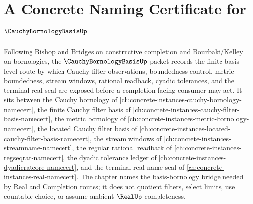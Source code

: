 \chapter{A Concrete Naming Certificate for $\CauchyBornologyBasisUp$}
\label{ch:concrete-instances-cauchy-bornology-basis-namecert}

Following Bishop and Bridges on constructive completion and Bourbaki/Kelley on bornologies, the $\CauchyBornologyBasisUp$ packet records the finite basis-level route by which Cauchy filter observations, boundedness control, metric boundedness, stream windows, rational readback, dyadic tolerances, and the terminal real seal are exposed before a completion-facing consumer may act. It sits between the Cauchy bornology of \autoref{ch:concrete-instances-cauchy-bornology-namecert}, the finite Cauchy filter basis of \autoref{ch:concrete-instances-cauchy-filter-basis-namecert}, the metric bornology of \autoref{ch:concrete-instances-metric-bornology-namecert}, the located Cauchy filter basis of \autoref{ch:concrete-instances-located-cauchy-filter-basis-namecert}, the stream windows of \autoref{ch:concrete-instances-streamname-namecert}, the regular rational readback of \autoref{ch:concrete-instances-regseqrat-namecert}, the dyadic tolerance ledger of \autoref{ch:concrete-instances-dyadicratcore-namecert}, and the terminal real-name seal of \autoref{ch:concrete-instances-real-namecert}. The chapter names the basis-bornology bridge needed by Real and Completion routes; it does not quotient filters, select limits, use countable choice, or assume ambient $\RealUp$ completeness.

